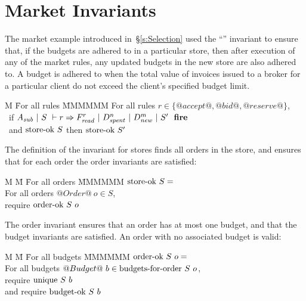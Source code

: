 \eject
\section{Market Invariants}

The market example introduced in~\S\ref{s:Selection} used the ``'' invariant to ensure that, if the budgets are adhered to in a particular store, then after execution of any of the market rules, any updated budgets in the new store are also adhered to.
A budget is adhered to when the total value of invoices issued to a broker for a particular client do not exceed the client's specified budget limit.

\begin{tabbing}
M \= For all rules \= MMMMMM \kill
\> For all rules \> $r \in \{@accept@, @bid@, @reserve@\}$, \\
\> ~if   \> $A_{\mathit{sub}}~|~S~\vdash r \Rightarrow F_{\mathit{read}}^r~|~D_{\mathit{spent}}^n~|~D_{\mathit{new}}^m~|~S'~~\textbf{fire}$ \\
\> ~and \> $\textrm{store-ok}~{S}$ \hspace{1ex} then \hspace{1ex} $\textrm{store-ok}~{S'}$
\end{tabbing}

The definition of the invariant for stores finds all orders in the store, and ensures that for each order the order invariants are satisfied:

\begin{tabbing}
M \= M \= For all orders \= MMMMMM \kill
\> $\textrm{store-ok}~{S} = $ \\
\> \> For all orders \> $@Order@~o \in S$, \\
\> \> require \> $\textrm{order-ok}~{S}~o$
\end{tabbing}

The order invariant ensures that an order has at most one budget, and that the budget invariants are satisfied. An order with no associated budget is valid:

\begin{tabbing}
M \= M \= For all budgets \= MMMMMM \kill
\> $\textrm{order-ok}~{S}~o = $ \\
\> \> For all budgets \> $@Budget@~b \in \textrm{budgets-for-order}~S~o$, \\
\> \> require \> $\textrm{unique}~S~b$ \\
\> \> and require \> $\textrm{budget-ok}~{S}~b$
\end{tabbing}

